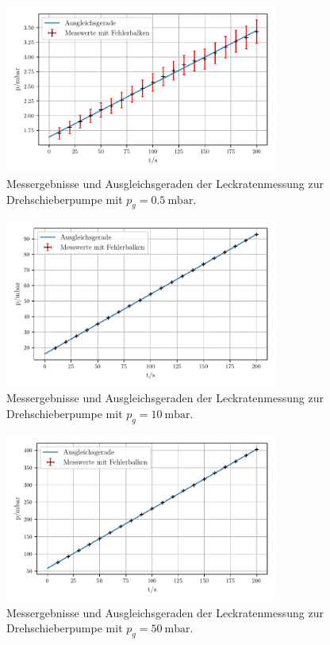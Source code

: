     \begin{figure}
        \centering
        \includegraphics[width=0.8\textwidth]{abb/dreh_leck0.5.pdf}
        \caption{Messergebnisse und Ausgleichsgeraden der Leckratenmessung zur Drehschieberpumpe mit $p_g = \qty{0.5}{\milli\bar}$.}
        \label{fig:drehLeck05}
    \end{figure}

    \begin{figure}
        \centering
        \includegraphics[width=0.8\textwidth]{abb/dreh_leck10.pdf}
        \caption{Messergebnisse und Ausgleichsgeraden der Leckratenmessung zur Drehschieberpumpe mit $p_g = \qty{10}{\milli\bar}$.}
        \label{fig:drehLeck10}
    \end{figure}

    \begin{figure}
        \centering
        \includegraphics[width=0.8\textwidth]{abb/dreh_leck50.pdf}
        \caption{Messergebnisse und Ausgleichsgeraden der Leckratenmessung zur Drehschieberpumpe mit $p_g = \qty{50}{\milli\bar}$.}
        \label{fig:drehLeck50}
    \end{figure}

